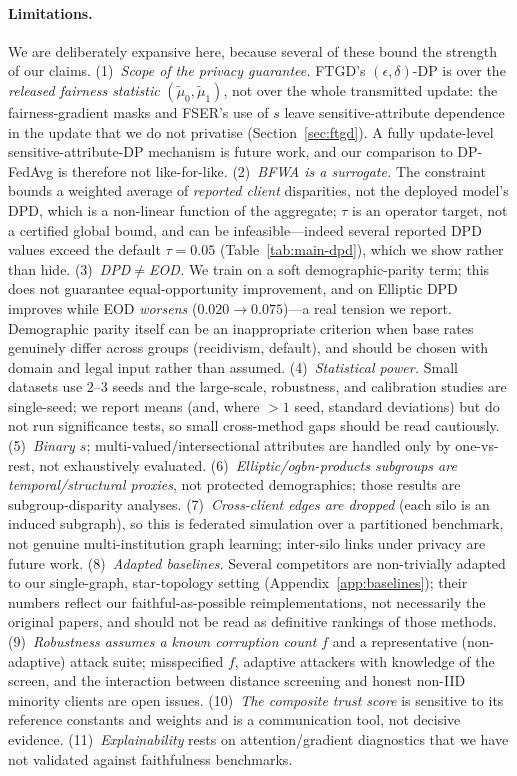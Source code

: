 \documentclass[pdflatex,sn-mathphys-num]{sn-jnl}
\theoremstyle{thmstyleone}%
\theoremstyle{thmstyletwo}%
\theoremstyle{thmstylethree}%
\begin{document}
\paragraph{Limitations.}
We are deliberately expansive here, because several of these bound the strength
of our claims. (1)~\emph{Scope of the privacy guarantee.} FTGD's
$(\epsilon,\delta)$-DP is over the \emph{released fairness statistic}
$(\tilde\mu_0,\tilde\mu_1)$, not over the whole transmitted update: the
fairness-gradient masks and FSER's use of $s$ leave sensitive-attribute
dependence in the update that we do not privatise (Section~\ref{sec:ftgd}). A
fully update-level sensitive-attribute-DP mechanism is future work, and our
comparison to DP-FedAvg is therefore not like-for-like. (2)~\emph{BFWA is a
surrogate.} The constraint bounds a weighted average of \emph{reported client}
disparities, not the deployed model's DPD, which is a non-linear function of the
aggregate; $\tau$ is an operator target, not a certified global bound, and can
be infeasible---indeed several reported DPD values exceed the default
$\tau{=}0.05$ (Table~\ref{tab:main-dpd}), which we show rather than hide.
(3)~\emph{DPD$\neq$EOD.} We train on a soft demographic-parity term; this does
not guarantee equal-opportunity improvement, and on Elliptic DPD improves while
EOD \emph{worsens} ($0.020\!\to\!0.075$)---a real tension we report. Demographic
parity itself can be an inappropriate criterion when base rates genuinely differ
across groups (recidivism, default), and should be chosen with domain and legal
input rather than assumed. (4)~\emph{Statistical power.} Small datasets use
$2$--$3$ seeds and the large-scale, robustness, and calibration studies are
single-seed; we report means (and, where $>1$ seed, standard deviations) but do
not run significance tests, so small cross-method gaps should be read cautiously.
(5)~\emph{Binary $s$}; multi-valued/intersectional attributes are handled only by
one-vs-rest, not exhaustively evaluated. (6)~\emph{Elliptic/ogbn-products
subgroups are temporal/structural proxies}, not protected demographics; those
results are subgroup-disparity analyses. (7)~\emph{Cross-client edges are
dropped} (each silo is an induced subgraph), so this is federated simulation over
a partitioned benchmark, not genuine multi-institution graph learning; inter-silo
links under privacy are future work. (8)~\emph{Adapted baselines.} Several
competitors are non-trivially adapted to our single-graph, star-topology setting
(Appendix~\ref{app:baselines}); their numbers reflect our faithful-as-possible
reimplementations, not necessarily the original papers, and should not be read as
definitive rankings of those methods. (9)~\emph{Robustness assumes a known
corruption count} $f$ and a representative (non-adaptive) attack suite;
misspecified $f$, adaptive attackers with knowledge of the screen, and the
interaction between distance screening and honest non-IID minority clients are
open issues. (10)~\emph{The composite trust score} is sensitive to its reference
constants and weights and is a communication tool, not decisive evidence.
(11)~\emph{Explainability} rests on attention/gradient diagnostics that we have
not validated against faithfulness benchmarks.
\end{document}
